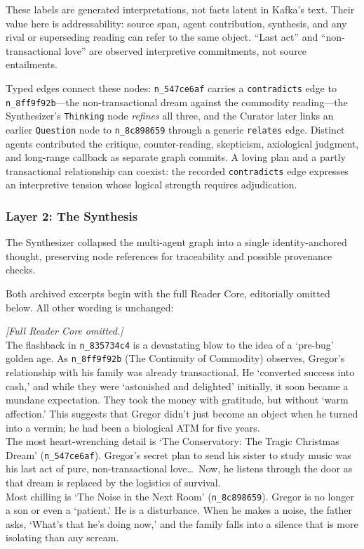 \documentclass[11pt]{article}
\begin{document}
These labels are generated interpretations, not facts latent in Kafka's text.
Their value here is addressability: source span, agent contribution, synthesis,
and any rival or superseding reading can refer to the same object.
``Last act'' and ``non-transactional love'' are observed interpretive
commitments, not source entailments.

Typed edges connect these nodes: \texttt{n\_547ce6af} carries a
\texttt{contradicts} edge to \texttt{n\_8ff9f92b}---the non-transactional dream
against the commodity reading---the Synthesizer's \texttt{Thinking} node
\emph{refines} all three, and the Curator later links an earlier \texttt{Question} node to
\texttt{n\_8c898659} through a generic \texttt{relates} edge. Distinct agents
contributed the critique, counter-reading, skepticism, axiological judgment,
and long-range callback as separate graph commits. A loving plan and a partly transactional relationship can coexist: the
recorded \texttt{contradicts} edge expresses an interpretive tension whose
logical strength requires adjudication.

\subsubsection{Layer 2: The Synthesis}

The Synthesizer collapsed the multi-agent graph into a single identity-anchored thought, preserving node references for traceability and possible provenance checks.

Both archived excerpts begin with the full Reader Core, editorially omitted
below. All other wording is unchanged:

\begin{metabox}
\textrm{\textit{[Full Reader Core omitted.]}}\\[1em]
The flashback in \texttt{n\_835734c4} is a devastating blow to the idea of a `pre-bug' golden age. As \texttt{n\_8ff9f92b} (The Continuity of Commodity) observes, Gregor's relationship with his family was already transactional. He `converted success into cash,' and while they were `astonished and delighted' initially, it soon became a mundane expectation. They took the money with gratitude, but without `warm affection.' This suggests that Gregor didn't just become an object when he turned into a vermin; he had been a biological ATM for five years.\\[0.5em]
The most heart-wrenching detail is `The Conservatory: The Tragic Christmas Dream' (\texttt{n\_547ce6af}). Gregor's secret plan to send his sister to study music was his last act of pure, non-transactional love\ldots\ Now, he listens through the door as that dream is replaced by the logistics of survival.\\[0.5em]
Most chilling is `The Noise in the Next Room' (\texttt{n\_8c898659}). Gregor is no longer a son or even a `patient.' He is a disturbance. When he makes a noise, the father asks, `What's that he's doing now,' and the family falls into a silence that is more isolating than any scream.
\end{metabox}
\end{document}

